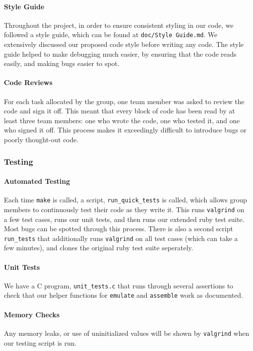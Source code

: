 \documentclass[10pt]{article}
\begin{document}
\paragraph{Style Guide}
Throughout the project, in order to ensure consistent styling in our code, we followed a style guide, which can be found at \texttt{doc/Style Guide.md}. We extensively discussed our proposed code style before writing any code. The style guide helped to make debugging much easier, by ensuring that the code reads easily, and making bugs easier to spot.

\paragraph{Code Reviews}
For each task allocated by the group, one team member was asked to review the code and sign it off. This meant that every block of code has been read by at least three team members: one who wrote the code, one who tested it, and one who signed it off. This process makes it exceedingly difficult to introduce bugs or poorly thought-out code.

\subsubsection{Testing}

\paragraph{Automated Testing}
Each time \texttt{make} is called, a script, \texttt{run\_quick\_tests} is called, which allows group members to continuously test their code as they write it. This runs \texttt{valgrind} on a few test cases, runs our unit tests, and then runs our extended ruby test suite. Most bugs can be spotted through this process. There is also a second script \texttt{run\_tests} that additionally runs \texttt{valgrind} on all test cases (which can take a few minutes), and clones the original ruby test suite seperately.

\paragraph{Unit Tests}
We have a C program, \texttt{unit\_tests.c} that runs through several assertions to check that our helper functions for \texttt{emulate} and \texttt{assemble} work as documented.

\paragraph{Memory Checks}
Any memory leaks, or use of uninitialized values will be shown by \texttt{valgrind} when our testing script is run.
\end{document}
